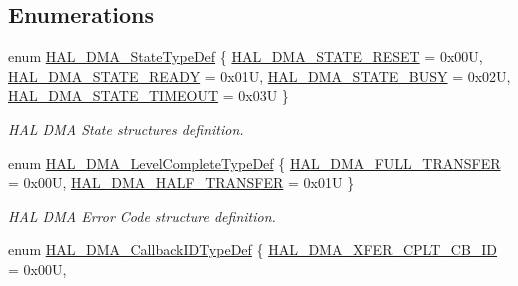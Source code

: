 \subsection*{Enumerations}
\begin{DoxyCompactItemize}
\item 
enum \hyperlink{group___d_m_a___exported___types_ga9c012af359987a240826f29073bbe463}{H\+A\+L\+\_\+\+D\+M\+A\+\_\+\+State\+Type\+Def} \{ \hyperlink{group___d_m_a___exported___types_gga9c012af359987a240826f29073bbe463a9e7be73da32b8c837cde0318e0d5eed2}{H\+A\+L\+\_\+\+D\+M\+A\+\_\+\+S\+T\+A\+T\+E\+\_\+\+R\+E\+S\+ET} = 0x00U, 
\hyperlink{group___d_m_a___exported___types_gga9c012af359987a240826f29073bbe463ad497944e6e72bc3ca904694b1098105a}{H\+A\+L\+\_\+\+D\+M\+A\+\_\+\+S\+T\+A\+T\+E\+\_\+\+R\+E\+A\+DY} = 0x01U, 
\hyperlink{group___d_m_a___exported___types_gga9c012af359987a240826f29073bbe463af7a0a2ca8de4e5be9e85b6a9073476ef}{H\+A\+L\+\_\+\+D\+M\+A\+\_\+\+S\+T\+A\+T\+E\+\_\+\+B\+U\+SY} = 0x02U, 
\hyperlink{group___d_m_a___exported___types_gga9c012af359987a240826f29073bbe463acf3a5443bf4dc71018512a255e2076eb}{H\+A\+L\+\_\+\+D\+M\+A\+\_\+\+S\+T\+A\+T\+E\+\_\+\+T\+I\+M\+E\+O\+UT} = 0x03U
 \}\begin{DoxyCompactList}\small\item\em H\+AL D\+MA State structures definition. \end{DoxyCompactList}
\item 
enum \hyperlink{group___d_m_a___exported___types_gaee3245eea8fa938edeb35a6c9596fd86}{H\+A\+L\+\_\+\+D\+M\+A\+\_\+\+Level\+Complete\+Type\+Def} \{ \hyperlink{group___d_m_a___exported___types_ggaee3245eea8fa938edeb35a6c9596fd86a5314147c8ba21548763bf89446b78468}{H\+A\+L\+\_\+\+D\+M\+A\+\_\+\+F\+U\+L\+L\+\_\+\+T\+R\+A\+N\+S\+F\+ER} = 0x00U, 
\hyperlink{group___d_m_a___exported___types_ggaee3245eea8fa938edeb35a6c9596fd86ad0ba8bc74a2ae6dcdc3e316e8be0d5d8}{H\+A\+L\+\_\+\+D\+M\+A\+\_\+\+H\+A\+L\+F\+\_\+\+T\+R\+A\+N\+S\+F\+ER} = 0x01U
 \}\begin{DoxyCompactList}\small\item\em H\+AL D\+MA Error Code structure definition. \end{DoxyCompactList}
\item 
enum \hyperlink{group___d_m_a___exported___types_gafbe8b2bd9ce2128de6cdc08ccde7e8ad}{H\+A\+L\+\_\+\+D\+M\+A\+\_\+\+Callback\+I\+D\+Type\+Def} \{ \newline
\hyperlink{group___d_m_a___exported___types_ggafbe8b2bd9ce2128de6cdc08ccde7e8ada7d4463d9db2e6d15282128b44ae08e12}{H\+A\+L\+\_\+\+D\+M\+A\+\_\+\+X\+F\+E\+R\+\_\+\+C\+P\+L\+T\+\_\+\+C\+B\+\_\+\+ID} = 0x00U, 

\end{DoxyCompactItemize}
